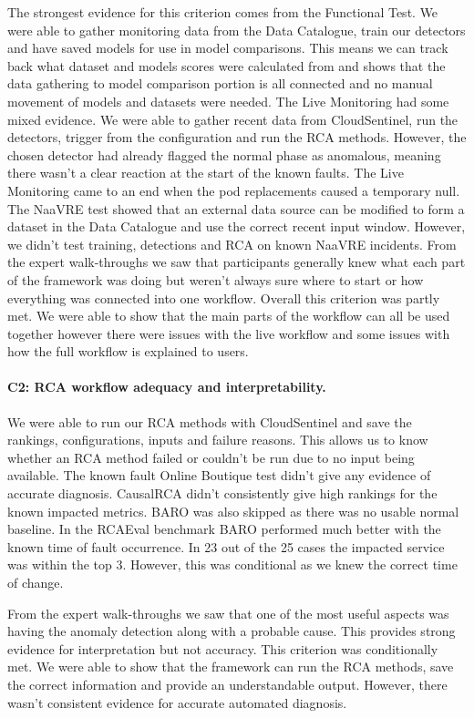 The strongest evidence for this criterion comes from the Functional Test. We were able to gather monitoring data from the Data Catalogue, train our detectors and have saved models for use in model comparisons. This means we can track back what dataset and models scores were calculated from and shows that the data gathering to model comparison portion is all connected and no manual movement of models and datasets were needed. The Live Monitoring had some mixed evidence. We were able to gather recent data from CloudSentinel, run the detectors, trigger from the configuration and run the RCA methods. However, the chosen detector had already flagged the normal phase as anomalous, meaning there wasn’t a clear reaction at the start of the known faults. The Live Monitoring came to an end when the pod replacements caused a temporary null. The NaaVRE test showed that an external data source can be modified to form a dataset in the Data Catalogue and use the correct recent input window. However, we didn’t test training, detections and RCA on known NaaVRE incidents. From the expert walk-throughs we saw that participants generally knew what each part of the framework was doing but weren’t always sure where to start or how everything was connected into one workflow. Overall this criterion was partly met. We were able to show that the main parts of the workflow can all be used together however there were issues with the live workflow and some issues with how the full workflow is explained to users.

\paragraph{C2: RCA workflow adequacy and interpretability.}

We were able to run our RCA methods with CloudSentinel and save the rankings, configurations, inputs and failure reasons. This allows us to know whether an RCA method failed or couldn’t be run due to no input being available. The known fault Online Boutique test didn’t give any evidence of accurate diagnosis. CausalRCA didn’t consistently give high rankings for the known impacted metrics. BARO was also skipped as there was no usable normal baseline. In the RCAEval benchmark BARO performed much better with the known time of fault occurrence. In 23 out of the 25 cases the impacted service was within the top 3. However, this was conditional as we knew the correct time of change.

From the expert walk-throughs we saw that one of the most useful aspects was having the anomaly detection along with a probable cause. This provides strong evidence for interpretation but not accuracy. This criterion was conditionally met. We were able to show that the framework can run the RCA methods, save the correct information and provide an understandable output. However, there wasn’t consistent evidence for accurate automated diagnosis.


